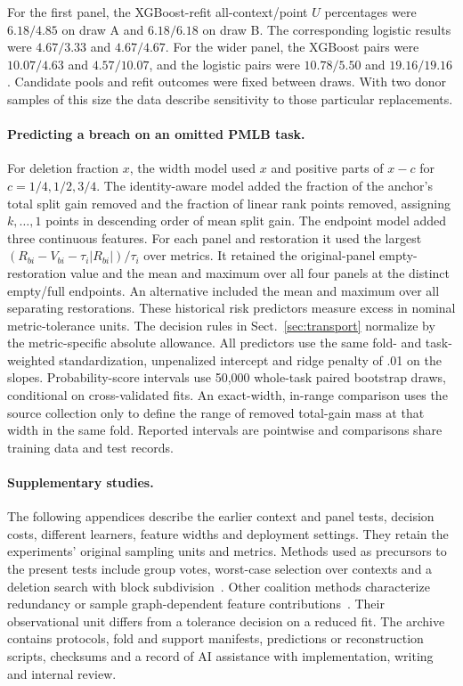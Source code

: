 For the first panel, the XGBoost-refit all-context/point $U$ percentages were $6.18/4.85$ on draw A and $6.18/6.18$ on draw B. The corresponding logistic results were $4.67/3.33$ and $4.67/4.67$. For the wider panel, the XGBoost pairs were $10.07/4.63$ and $4.57/10.07$, and the logistic pairs were $10.78/5.50$ and $19.16/19.16$. Candidate pools and refit outcomes were fixed between draws. With two donor samples of this size the data describe sensitivity to those particular replacements.

\paragraph{Predicting a breach on an omitted PMLB task.}
For deletion fraction $x$, the width model used $x$ and positive parts of $x-c$ for $c=1/4,1/2,3/4$. The identity-aware model added the fraction of the anchor's total split gain removed and the fraction of linear rank points removed, assigning $k,\ldots,1$ points in descending order of mean split gain. The endpoint model added three continuous features. For each panel and restoration it used the largest $(R_{bi}-V_{bi}-\tau_i|R_{bi}|)/\tau_i$ over metrics. It retained the original-panel empty-restoration value and the mean and maximum over all four panels at the distinct empty/full endpoints. An alternative included the mean and maximum over all separating restorations. These historical risk predictors measure excess in nominal metric-tolerance units. The decision rules in Sect.~\ref{sec:transport} normalize by the metric-specific absolute allowance. All predictors use the same fold- and task-weighted standardization, unpenalized intercept and ridge penalty of .01 on the slopes. Probability-score intervals use 50,000 whole-task paired bootstrap draws, conditional on cross-validated fits. An exact-width, in-range comparison uses the source collection only to define the range of removed total-gain mass at that width in the same fold. Reported intervals are pointwise and comparisons share training data and test records.

\paragraph{Supplementary studies.}
The following appendices describe the earlier context and panel tests, decision costs, different learners, feature widths and deployment settings. They retain the experiments' original sampling units and metrics. Methods used as precursors to the present tests include group votes, worst-case selection over contexts and a deletion search with block subdivision~\cite{shi2026minpi,zeller2002ddmin}. Other coalition methods characterize redundancy or sample graph-dependent feature contributions~\cite{zheng2026minshap,zhao2025shapg}. Their observational unit differs from a tolerance decision on a reduced fit. The archive contains protocols, fold and support manifests, predictions or reconstruction scripts, checksums and a record of AI assistance with implementation, writing and internal review.
